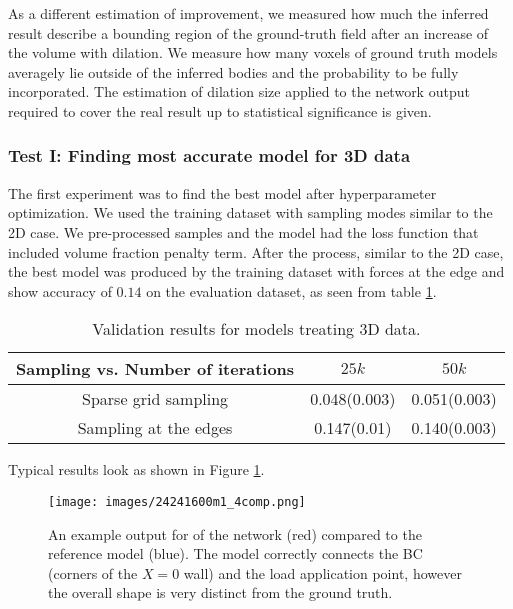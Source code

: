 As a different estimation of improvement, we measured how much the inferred result describe a bounding region of the ground-truth field after an increase of the volume with dilation.
We measure how many voxels of ground truth models averagely lie outside of the inferred bodies and the probability to be fully incorporated.
The estimation of dilation size applied to the network output required to cover the real result up to statistical significance is given.


\subsubsection{Test I: Finding most accurate model for 3D data}

The first experiment was to find the best model after hyperparameter optimization.
We used the training dataset with sampling modes similar to the 2D case.
We pre-processed samples and the model had the loss function that included volume fraction penalty term.
After the process, similar to the 2D case, the best model was produced by the training dataset with forces at the edge and show accuracy of $0.14$ on the evaluation dataset, as seen from table \ref{tab:3d_valid}. 

\begin{table}[h]
	\begin{center}
		\begin{tabular}{ |c|c|c| }
			\hline
			 Sampling vs. Number of  iterations & $25k$ & $50k$ \\ 
			\hline
			Sparse grid sampling & 0.048(0.003) & 0.051(0.003) \\
			Sampling at the edges & 0.147(0.01) & 0.140(0.003) \\
			\hline
		\end{tabular}
	\end{center}
	\caption{Validation results for models treating 3D data.}\label{tab:3d_valid}
\end{table}

Typical results look as shown in Figure \ref{fig:3dres_ex}.
\begin{figure}[h]
	\centering
	\texttt{[image: images/24241600m1\_4comp.png]}
	\caption{An example output for of the network (red) compared to the reference model (blue). The model correctly connects the BC (corners of the $X=0$ wall) and the load application point, however the overall shape is very distinct from the ground truth.}
	\label{fig:3dres_ex}
\end{figure}

